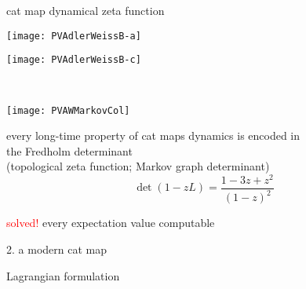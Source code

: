 \begin{frame}{cat map dynamical zeta function}
\begin{center}
            \begin{minipage}[c]{0.23\textwidth}\begin{center}
\texttt{[image: PVAdlerWeissB-a]}
            \end{center}\end{minipage}
            \begin{minipage}[c]{0.23\textwidth}\begin{center}
\texttt{[image: PVAdlerWeissB-c]}
            \end{center}\end{minipage}
            ~~~
            \begin{minipage}[c]{0.09\textwidth}\begin{center}
\texttt{[image: PVAWMarkovCol]}
            \end{center}\end{minipage}
\end{center}
every long-time property of cat maps dynamics is encoded in \\
the Fredholm determinant \\
(topological zeta function;
Markov graph determinant)
\[
\det(1-zL) = %
 \frac{1 - 3 z + z^2}{(1 - z)^2}
\]

{\Huge \textcolor{red}{solved!}} \hfill every expectation value computable
\end{frame}

\begin{frame}{2. a modern cat map}
\vfill
\begin{center}
{\huge Lagrangian formulation}
\end{center}
\vfill
\end{frame}

